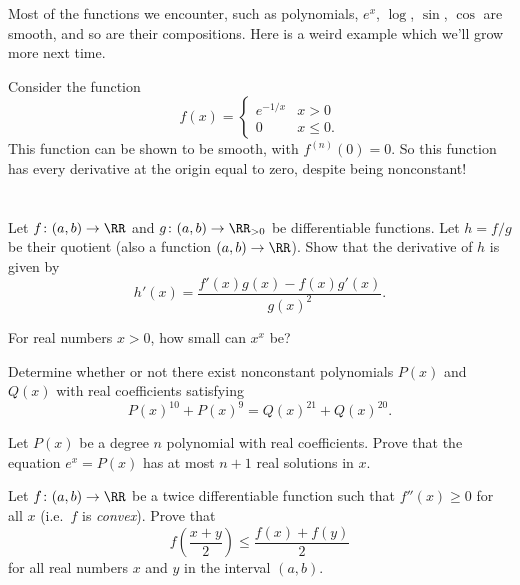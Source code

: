 Most of the functions we encounter,
such as polynomials, $e^x$, $\log$, $\sin$, $\cos$
are smooth, and so are their compositions.
Here is a weird example which we'll grow more next time.
\begin{example}
	Consider the function
	\[ f(x) = \begin{cases}
			e^{-1/x} & x > 0 \\
			0 & x \le 0.
		\end{cases}
	\]
	This function can be shown to be smooth,
	with $f^{(n)}(0) = 0$.
	So this function has every derivative at the origin
	equal to zero, despite being nonconstant!
\end{example}

\section{\problemhead}
\begin{problem}
	Let $f \colon (a,b) \to \RR$ and $g \colon (a,b) \to \RR_{>0}$
	be differentiable functions.
	Let $h = f/g$ be their quotient
	(also a function $(a,b) \to \RR$).
	Show that the derivative of $h$ is given by
	\[ h'(x) = \frac{f'(x) g(x) - f(x) g'(x)}{g(x)^2}. \]
\end{problem}

\begin{problem}
	For real numbers $x > 0$, how small can $x^x$ be?
\end{problem}

\begin{problem}
	[RMM 2018]
	\gim
	Determine whether or not there exist
	nonconstant polynomials $P(x)$ and $Q(x)$ with
	real coefficients satisfying
	\[ P(x)^{10} + P(x)^9 = Q(x)^{21} + Q(x)^{20}. \]
\end{problem}

\begin{problem}
	\gim
	Let $P(x)$ be a degree $n$ polynomial with real coefficients.
	Prove that the equation $e^x = P(x)$ has at most $n+1$ real solutions in $x$.
\end{problem}

\begin{problem}
	Let $f \colon (a,b) \to \RR$ be a twice differentiable function
	such that $f''(x) \ge 0$ for all $x$
	(i.e.\ $f$ is \emph{convex}).
	Prove that
	\[ f\left( \frac{x+y}{2} \right)
		\le \frac{f(x) + f(y)}{2} \]
	for all real numbers $x$ and $y$ in the interval $(a,b)$.
\end{problem}

